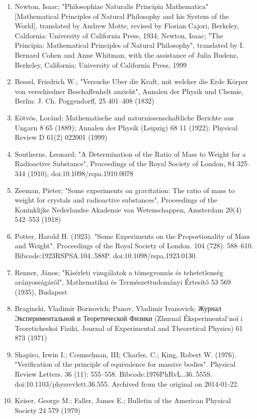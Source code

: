 \begin{enumerate}
\item Newton, Isaac; "Philosophiae Naturalis Principia Mathematica" [Mathematical Principles of Natural Philosophy and his System of the World], translated by Andrew Motte, revised by Florian Cajori, Berkeley, California: University of California Press, 1934; Newton, Isaac; "The Principia: Mathematical Principles of Natural Philosophy", translated by I. Bernard Cohen and Anne Whitman, with the assistance of Julia Budenz, Berkeley, California: University of California Press, 1999
\item Bessel, Friedrich W.; "Versuche Uber die Kraft, mit welcher die Erde Körper von verschiedner Beschaffenhelt anzieht", Annalen der Physik und Chemie, Berlin: J. Ch. Poggendorff, 25 401–408 (1832)
\item Eötvös, Loránd; Mathematische and naturnissenschaftliche Berichte aus Ungarn 8 65 (1889); Annalen der Physik (Leipzig) 68 11 (1922); Physical Review D 61(2) 022001 (1999)
\item Southerns, Leonard; "A Determination of the Ratio of Mass to Weight for a Radioactive Substance", Proceedings of the Royal Society of London, 84 325–344 (1910), doi:10.1098/rspa.1910.0078
\item Zeeman, Pieter; "Some experiments on gravitation: The ratio of mass to weight for crystals and radioactive substances", Proceedings of the Koninklijke Nederlandse Akademie van Wetenschappen, Amsterdam 20(4) 542–553 (1918)
\item Potter, Harold H. (1923). "Some Experiments on the Proportionality of Mass and Weight". Proceedings of the Royal Society of London. 104 (728): 588–610. Bibcode:1923RSPSA.104..588P. doi:10.1098/rspa.1923.0130.
\item Renner, János; "Kísérleti vizsgálatok a tömegvonzás és tehetetlenség arányosságáról", Mathematikai és Természettudományi Értesítő 53 569 (1935), Budapest
\item Braginski, Vladimir Borisovich; Panov, Vladimir Ivanovich; Журнал Экспериментальной и Теоретической Физики (Zhurnal Éksperimental’noĭ i Teoreticheskoĭ Fiziki, Journal of Experimental and Theoretical Physics) 61 873 (1971)
\item Shapiro, Irwin I.; Counselman, III; Charles, C.; King, Robert W. (1976). "Verification of the principle of equivalence for massive bodies". Physical Review Letters. 36 (11): 555–558. Bibcode:1976PhRvL..36..555S. doi:10.1103/physrevlett.36.555. Archived from the original on 2014-01-22.
\item Keiser, George M.; Faller, James E.; Bulletin of the American Physical Society 24 579 (1979)

\end{enumerate}
